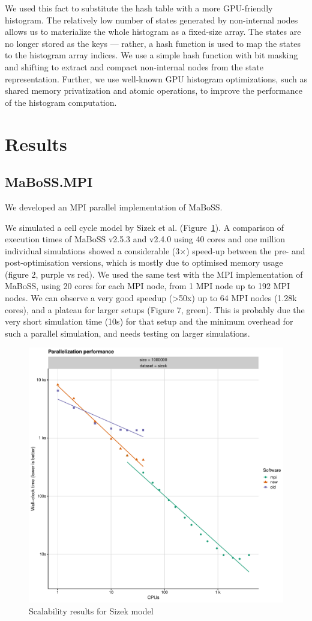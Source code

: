 \documentclass[times, twoside]{zHenriquesLab-StyleBioRxiv}
\begin{document}
We used this fact to substitute the hash table with a more GPU-friendly histogram. The relatively low number of states generated by non-internal nodes allows us to materialize the whole histogram as a fixed-size array. The states are no longer stored as the keys --- rather, a hash function is used to map the states to the histogram array indices. We use a simple hash function with bit masking and shifting to extract and compact non-internal nodes from the state representation. Further, we use well-known GPU histogram optimizations, such as shared memory privatization and atomic operations, to improve the performance of the histogram computation.


\section*{Results}

\subsection*{MaBoSS.MPI}
We developed an MPI parallel implementation of MaBoSS. 

We simulated a cell cycle model by Sizek et al.\cite{sizek2019boolean} (Figure~\ref{fig:sizek_results}). A comparison of execution times of MaBoSS v2.5.3 and v2.4.0 using 40 cores and one million individual simulations showed a considerable (3×) speed-up between the pre- and post-optimisation versions, which is mostly due to optimised memory usage (figure 2, purple vs red). We used the same test with the MPI implementation of MaBoSS, using 20 cores for each MPI node, from 1 MPI node up to 192 MPI nodes. We can observe a very good speedup (>50x) up to 64 MPI nodes (1.28k cores), and a plateau for larger setups (Figure 7, green). This is probably due the very short simulation time (10s) for that setup and the minimum overhead for such a parallel simulation, and needs testing on larger simulations.


\begin{figure}%
\centering
\includegraphics[width=.8\linewidth]{Figures/sizek_model.pdf}
\caption{Scalability results for Sizek model}
\label{fig:sizek_results}
\end{figure}
\end{document}
